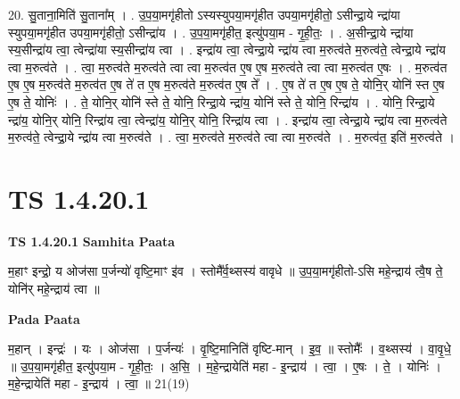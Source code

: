 \documentclass[17pt]{extarticle}
\begin{document}
20. सु॒ताना॒मिति॑ सु॒ताना᳚म् । . उ॒प॒या॒मगृ॑हीतो ऽस्यस्युपया॒मगृ॑हीत उपया॒मगृ॑हीतो॒ ऽसीन्द्रा॒ये न्द्रा॑या स्युपया॒मगृ॑हीत उपया॒मगृ॑हीतो॒ ऽसीन्द्रा॑य । . उ॒प॒या॒मगृ॑हीत॒ इत्यु॑पया॒म - गृ॒ही॒तः॒ । . अ॒सीन्द्रा॒ये न्द्रा॑या स्य॒सीन्द्रा॑य त्वा॒ त्वेन्द्रा॑या स्य॒सीन्द्रा॑य त्वा । . इन्द्रा॑य त्वा॒ त्वेन्द्रा॒ये न्द्रा॑य त्वा म॒रुत्व॑ते म॒रुत्व॑ते॒ त्वेन्द्रा॒ये न्द्रा॑य त्वा म॒रुत्व॑ते । . त्वा॒ म॒रुत्व॑ते म॒रुत्व॑ते त्वा त्वा म॒रुत्व॑त ए॒ष ए॒ष म॒रुत्व॑ते त्वा त्वा म॒रुत्व॑त ए॒षः । . म॒रुत्व॑त ए॒ष ए॒ष म॒रुत्व॑ते म॒रुत्व॑त ए॒ष ते॑ त ए॒ष म॒रुत्व॑ते म॒रुत्व॑त ए॒ष ते᳚ । . ए॒ष ते॑ त ए॒ष ए॒ष ते॒ योनि॒र् योनि॑ स्त ए॒ष ए॒ष ते॒ योनिः॑ । . ते॒ योनि॒र् योनि॑ स्ते ते॒ योनि॒ रिन्द्रा॒ये न्द्रा॑य॒ योनि॑ स्ते ते॒ योनि॒ रिन्द्रा॑य । . योनि॒ रिन्द्रा॒ये न्द्रा॑य॒ योनि॒र् योनि॒ रिन्द्रा॑य त्वा॒ त्वेन्द्रा॑य॒ योनि॒र् योनि॒ रिन्द्रा॑य त्वा । . इन्द्रा॑य त्वा॒ त्वेन्द्रा॒ये न्द्रा॑य त्वा म॒रुत्व॑ते म॒रुत्व॑ते॒ त्वेन्द्रा॒ये न्द्रा॑य त्वा म॒रुत्व॑ते । . त्वा॒ म॒रुत्व॑ते म॒रुत्व॑ते त्वा त्वा म॒रुत्व॑ते । . म॒रुत्व॑त॒ इति॑ म॒रुत्व॑ते । \newline
\pagebreak
{}
\section*{ TS 1.4.20.1 }

\textbf{TS 1.4.20.1 } \newline
\textbf{Samhita Paata} \newline

म॒हाꣳ इन्द्रो॒ य ओज॑सा प॒र्जन्यो॑ वृष्टि॒माꣳ इ॑व । स्तोमै᳚र्व॒थ्सस्य॑ वावृधे ॥ उ॒प॒या॒मगृ॑हीतो-ऽसि महे॒न्द्राय॑ त्वै॒ष ते॒ योनि॑र् महे॒न्द्राय॑ त्वा ॥ \newline

\textbf{Pada Paata} \newline

म॒हान् । इन्द्रः॑ । यः । ओज॑सा । प॒र्जन्यः॑ । वृ॒ष्टि॒मानिति॑ वृष्टि-मान् । इ॒व॒ ॥ स्तोमैः᳚ । व॒थ्सस्य॑ । वा॒वृ॒धे॒ ॥ उ॒प॒या॒मगृ॑हीत॒ इत्यु॑पया॒म - गृ॒ही॒तः॒ । अ॒सि॒ । म॒हे॒न्द्रायेति॑ महा - इ॒न्द्राय॑ । त्वा॒ । ए॒षः । ते॒ । योनिः॑ । म॒हे॒न्द्रायेति॑ महा - इ॒न्द्राय॑ । त्वा॒ ॥ 21(19)  \newline
\end{document}
